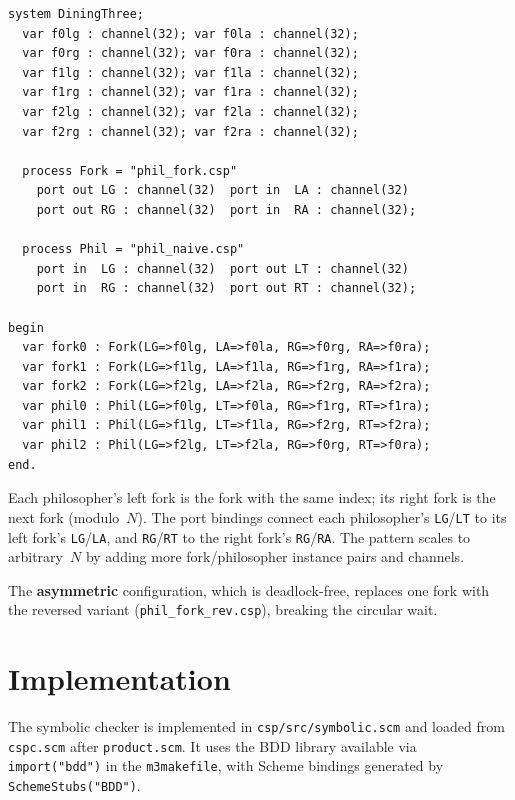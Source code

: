 \documentclass[11pt]{article}
\begin{document}
\begin{lstlisting}[frame=single,xleftmargin=1em,xrightmargin=1em,
    basicstyle=\ttfamily\footnotesize]
system DiningThree;
  var f0lg : channel(32); var f0la : channel(32);
  var f0rg : channel(32); var f0ra : channel(32);
  var f1lg : channel(32); var f1la : channel(32);
  var f1rg : channel(32); var f1ra : channel(32);
  var f2lg : channel(32); var f2la : channel(32);
  var f2rg : channel(32); var f2ra : channel(32);

  process Fork = "phil_fork.csp"
    port out LG : channel(32)  port in  LA : channel(32)
    port out RG : channel(32)  port in  RA : channel(32);

  process Phil = "phil_naive.csp"
    port in  LG : channel(32)  port out LT : channel(32)
    port in  RG : channel(32)  port out RT : channel(32);

begin
  var fork0 : Fork(LG=>f0lg, LA=>f0la, RG=>f0rg, RA=>f0ra);
  var fork1 : Fork(LG=>f1lg, LA=>f1la, RG=>f1rg, RA=>f1ra);
  var fork2 : Fork(LG=>f2lg, LA=>f2la, RG=>f2rg, RA=>f2ra);
  var phil0 : Phil(LG=>f0lg, LT=>f0la, RG=>f1rg, RT=>f1ra);
  var phil1 : Phil(LG=>f1lg, LT=>f1la, RG=>f2rg, RT=>f2ra);
  var phil2 : Phil(LG=>f2lg, LT=>f2la, RG=>f0rg, RT=>f0ra);
end.
\end{lstlisting}

Each philosopher's left fork is the fork with the same index; its
right fork is the next fork (modulo~$N$).  The port bindings connect
each philosopher's \texttt{LG}/\texttt{LT} to its left fork's
\texttt{LG}/\texttt{LA}, and \texttt{RG}/\texttt{RT} to the right
fork's \texttt{RG}/\texttt{RA}.  The pattern scales to arbitrary~$N$
by adding more fork/philosopher instance pairs and channels.

The \textbf{asymmetric} configuration, which is deadlock-free, replaces
one fork with the reversed variant (\texttt{phil\_fork\_rev.csp}),
breaking the circular wait.

\section{Implementation}

The symbolic checker is implemented in \texttt{csp/src/symbolic.scm}
and loaded from \texttt{cspc.scm} after \texttt{product.scm}.  It
uses the BDD library available via \texttt{import("bdd")} in the
\texttt{m3makefile}, with Scheme bindings generated by
\texttt{SchemeStubs("BDD")}.
\end{document}
